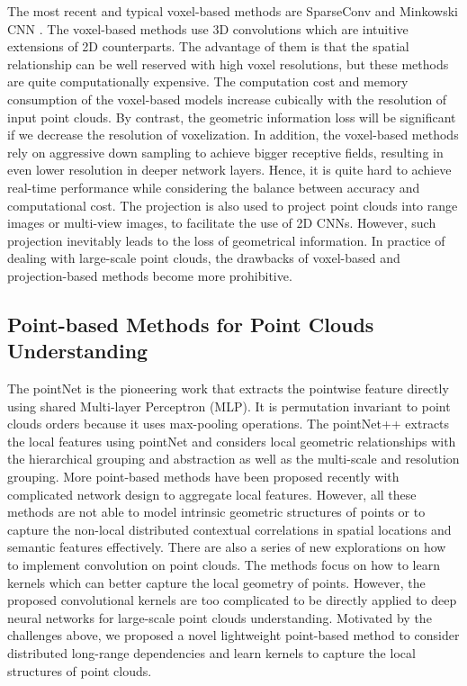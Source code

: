 \documentclass[journal]{IEEEtran}
\begin{document}
The most recent and typical voxel-based methods are SparseConv \cite{graham20183d} and Minkowski CNN \cite{choy20194d}. The voxel-based methods use 3D convolutions which are intuitive extensions of 2D counterparts. The advantage of them is that the spatial relationship can be well reserved with high voxel resolutions, but these methods are quite computationally expensive. The computation cost and memory consumption of the voxel-based models increase cubically with the resolution of input point clouds. By contrast, the geometric information loss will be 
significant if we decrease the resolution of voxelization. In addition, the voxel-based methods rely on aggressive down sampling to achieve bigger receptive fields, resulting in even lower resolution in deeper network layers. Hence, it is quite hard to achieve real-time performance while considering the balance between accuracy and computational cost. The projection is also used to project point clouds into range images\cite{milioto2019rangenet++,wu2019squeezesegv2,xu2020squeezesegv3} or multi-view images\cite{feng2018gvcnn,kundu2020virtual,li2020end,gojcic2020learning}, to facilitate the use of 2D CNNs. However, such projection inevitably leads to the loss of geometrical information. In practice of dealing with large-scale point clouds, the drawbacks of voxel-based and projection-based methods become more prohibitive.

\subsection{Point-based Methods for Point Clouds Understanding} 
The pointNet \cite{qi2017pointnet} is the pioneering work that extracts the pointwise feature directly using shared Multi-layer Perceptron (MLP). It is permutation invariant to point clouds orders because it uses max-pooling operations. The pointNet++\cite{qi2017pointnet++} extracts the local features using pointNet and considers local geometric relationships with the hierarchical grouping and abstraction as well as the multi-scale and resolution grouping. More point-based methods\cite{li2018pointcnn,nezhadarya2020adaptive,landrieu2019point} have been proposed recently with complicated network design to aggregate local features. However, all these methods are not able to model intrinsic geometric structures of points or to capture the non-local distributed contextual correlations in spatial locations and semantic features effectively. There are also a series of new explorations on how to implement convolution on point clouds. The methods \cite{shen2018mining,thomas2019kpconv,lei2020spherical} focus on how to learn kernels which can better capture the local geometry of points. However, the proposed convolutional kernels are too complicated to be directly applied to deep neural networks for large-scale point clouds understanding. Motivated by the challenges above, we proposed a novel lightweight point-based method to consider distributed long-range dependencies and learn kernels to capture the local structures of point clouds. 
\end{document}
